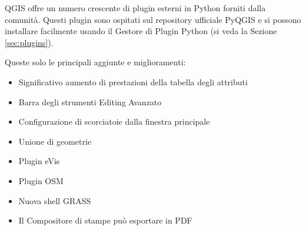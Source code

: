 
QGIS offre un numero crescente di plugin esterni in Python forniti
dalla comunità. Questi plugin sono ospitati sul repository ufficiale
PyQGIS e si possono installare facilmente usando il Gestore di
Plugin Python (si veda la Sezione \ref{sec:plugins}).


Queste solo le principali aggiunte e miglioramenti:
\begin{itemize}
 \item Significativo aumento di prestazioni della tabella degli attributi
 \item Barra degli strumenti Editing Avanzato
 \item Configurazione di scorciatoie dalla finestra principale
 \item Unione di geometrie 
 \item Plugin eVis
 \item Plugin OSM 
 \item Nuova shell GRASS
 \item Il Compositore di stampe può esportare in PDF
\end{itemize}


